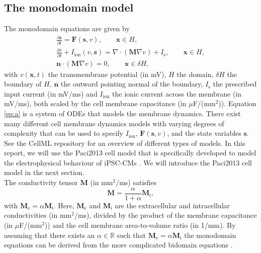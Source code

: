 \documentclass{article}
\begin{document}
\subsection{The monodomain model} \label{The monodomain model}
The monodomain equations are given by 
\begin{eqnarray} \label{eq:a}
\frac{\partial \mathbf{s}}{\partial t}= \mathbf{F}(\mathbf{s},v), \qquad \mathbf{x} \in H, \\
\frac{\partial v}{\partial t} + I_{\mathrm{ion}}(v,\mathbf{s}) =\nabla \label{eq:b} \cdot(\mathbf{M}\nabla v) + I_{\mathrm{s}},\qquad \mathbf{x} \in H, \\ \label{eq:c}
\mathbf{n}\cdot (\mathbf{M}\nabla v)=0, \qquad \mathbf{x} \in \delta H,
\end{eqnarray}
with $v(\mathbf{x},t)$ the transmembrane potential (in mV), $H$ the domain, $\delta H$ the boundary of $H$, $\mathbf{n}$ the outward pointing normal of the boundary,  $I_{\mathrm{s}}$ the prescribed input current (in mV/ms) and $I_{\mathrm{ion}}$ the ionic current across the membrane (in mV/ms), both scaled by the cell membrane capacitance (in $\mu$F/(mm$^2$)). 
Equation \eqref{eq:a} is a system of ODEs that models the membrane dynamics. There exist many different cell membrane dynamics models with varying degrees of complexity that can be used to specify $I_{\mathrm{ion}}$, $\mathbf{F}(\mathbf{s},v)$, and the state variables $\mathbf{s}$. See the CellML repository \cite{cellml} for an overview of different types of models. In this report, we will use the Paci2013 cell model that is specifically developed to model the electrophysical behaviour of iPSC-CMs \cite{Paci2013}. We will introduce the Paci2013 cell model in the next section.\\ The conductivity tensor $\mathbf{M}$ (in mm$^2$/ms) satisfies 
\begin{equation}
\mathbf{M}=\frac{\alpha}{1+\alpha}\mathbf{M}_{\mathrm{i}},\label{eq:d}
\end{equation}
with $\mathbf{M}_{\mathrm{e}}=\alpha \mathbf{M}_{\mathrm{i}}$. Here, $\mathbf{M}_{\mathrm{e}}$ and $\mathbf{M}_{\mathrm{i}}$ are the extracellular and intracellular conductivities (in mm$^2$/ms), divided by the product of the membrane capacitance (in $\mu$F/(mm$^2$)) and the cell membrane area-to-volume ratio (in 1/mm). By assuming that there exists an $\alpha \in \mathbb{R}$ such that $\mathbf{M}_{\mathrm{e}}=\alpha \mathbf{M}_{\mathrm{i}}$ the monodomain equations can be derived from the more complicated bidomain equations \cite[p. 566-568]{KeenerI}.
%
\end{document}
